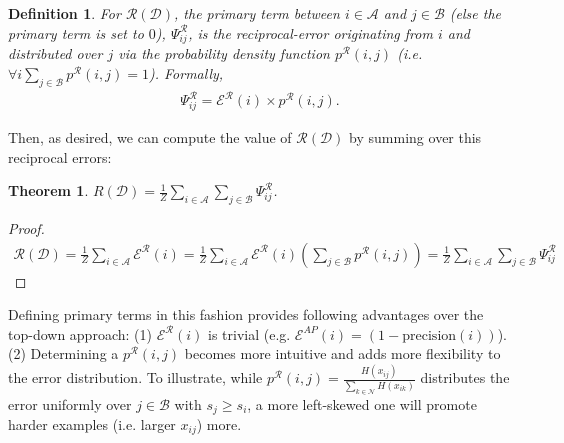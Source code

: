 \documentclass{article}
\newtheorem{theorem}{Theorem}
\newtheorem{definition}{Definition}
\begin{document}
{\begin{definition}
For $\mathcal{R}(\mathcal{D})$, the primary term between $i \in \mathcal{A}$ and $j \in \mathcal{B}$ (else the primary term is set to $0$), $\Psi^\mathcal{R}_{ij}$, is the reciprocal-error originating from $i$ and distributed over $j$ via the probability density function $p^ \mathcal{R} (i, j)$ (i.e. $\forall i \sum \limits_{j \in \mathcal{B}} p^\mathcal{R}(i, j) = 1$). Formally, 
\begin{align}
    \label{eq:GeneralPrimaryTermDefinition}
    \Psi^\mathcal{R}_{ij} = \mathcal{E}^\mathcal{R} (i) \times p^\mathcal{R} (i, j).
\end{align}
\end{definition}
Then, as desired, we can compute  the value of $\mathcal{R}(\mathcal{D})$ by summing over this reciprocal errors:
\begin{theorem}
\label{theorem:PrimaryTerms}
$R(\mathcal{D})=  
\frac{1}{Z} \sum \limits_{i \in \mathcal{A} }\sum \limits_{j \in \mathcal{B} }  \Psi^ \mathcal{R}_{ij}$.
\end{theorem}{}
\begin{proof}
\begin{align}
    \mathcal{R}(\mathcal{D}) =\frac{1}{Z} \sum \limits_{i \in \mathcal{A} }  \mathcal{E}^\mathcal{R} (i)  
=\frac{1}{Z} \sum \limits_{i \in \mathcal{A}}  \mathcal{E}^\mathcal{R} (i) \left( \sum \limits_{j \in  \mathcal{B} }p^\mathcal{R} (i, j)    \right)
    = \frac{1}{Z} \sum \limits_{i \in \mathcal{A} }\sum \limits_{j \in \mathcal{B} }  \Psi^ \mathcal{R}_{ij}
\end{align}
\end{proof}


Defining primary terms in this fashion provides following advantages over the top-down approach: (1) $\mathcal{E}^\mathcal{R} (i)$ is trivial (e.g. $\mathcal{E}^{AP} (i) = (1-\mathrm{precision}(i))$). (2) Determining a $p^\mathcal{R}(i, j)$ becomes more intuitive and adds more flexibility to the error distribution. To illustrate, while $p^{\mathcal{R}}(i, j) = \frac{H(x_{ij})}{\sum \limits_{k \in {\mathcal{N}}}H(x_{ik})}$ distributes the error uniformly over $j \in \mathcal{B}$ with $s_j \geq s_i$, a more left-skewed one will promote harder examples (i.e. larger $x_{ij}$) more. 

}
\end{document}
